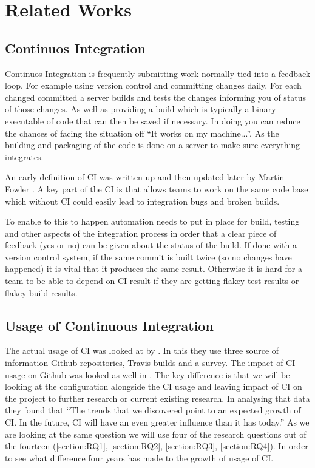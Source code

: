 \documentclass[10pt,conference]{IEEEtran}
\begin{document}
\section{Related Works}
\vspace*{-0.05in}
\subsection{Continuos Integration}
\vspace*{-0.05in}

Continuos Integration is frequently submitting work normally tied into a feedback loop. For example using version control and committing changes daily. For each changed committed a server builds and tests the changes informing you of status of those changes. As well as providing a build which is typically a binary executable of code that can then be saved if necessary. In doing you can reduce the chances of facing the situation off \enquote{It works on my machine...}. As the building and packaging of the code is done on a server to make sure everything integrates.

An early definition of CI was written up and then updated later by Martin Fowler \cite{CI2010_MartinFowler}. A key part of the CI is that allows teams to work on the same code base which without CI could easily lead to integration bugs and broken builds. 

To enable to this to happen automation needs to put in place for build, testing and other aspects of the integration process in order that a clear piece of feedback (yes or no) can be given about the status of the build. If done with a version control system, if the same commit is built twice (so no changes have happened) it is vital that it produces the same result. Otherwise it is hard for a team to be able to depend on CI result if they are getting flakey test results or flakey build results.

\vspace*{-0.05in}
\subsection{Usage of Continuous Integration}
\vspace*{-0.05in}

The actual usage of CI was looked at by \cite{Hilton2016}. In this they use three source of information Github repositories, Travis builds and a survey. The impact of CI usage on Github was looked as well in \citet{Vasilescu2015}. The key difference is that we will be looking at the configuration alongside the CI usage and leaving impact of CI on the project to further research or current existing research. In analysing that data they found that \enquote{The trends that we discovered point to an expected growth of CI. In the future, CI will have an even greater influence than it has today.} As we are looking at the same question we will use four of the research questions out of the fourteen (\ref{section:RQ1}, \ref{section:RQ2}, \ref{section:RQ3}, \ref{section:RQ4}). In order to see what difference four years has made to the growth of usage of CI.
\end{document}
